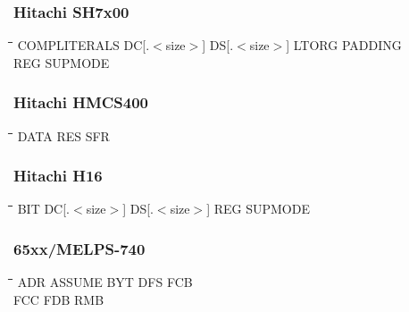 \subsubsection{Hitachi SH7x00}
{\tt\begin{tabbing}
\hspace{3cm}\=\hspace{3cm}\=\hspace{3cm}\=\hspace{3cm}\=\kill
COMPLITERALS \> DC[.$<$size$>$]  \>  DS[.$<$size$>$]  \>  LTORG    \> PADDING \\
REG          \> SUPMODE \\
\end{tabbing}}

\subsubsection{Hitachi HMCS400}
{\tt\begin{tabbing}
\hspace{3cm}\=\hspace{3cm}\=\hspace{3cm}\=\hspace{3cm}\=\kill
DATA       \> RES         \> SFR \\
\end{tabbing}}

\subsubsection{Hitachi H16}
{\tt\begin{tabbing}
\hspace{3cm}\=\hspace{3cm}\=\hspace{3cm}\=\hspace{3cm}\=\kill
BIT        \> DC[.$<$size$>$]    \> DS[.$<$size$>$]   \> REG       \> SUPMODE \\
\end{tabbing}}

\subsubsection{65xx/MELPS-740}
{\tt\begin{tabbing}
\hspace{3cm}\=\hspace{3cm}\=\hspace{3cm}\=\hspace{3cm}\=\kill
ADR        \> ASSUME      \> BYT         \> DFS         \> FCB \\
FCC        \> FDB         \> RMB \\
\end{tabbing}}

